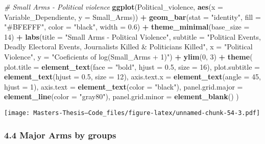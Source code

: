 \documentclass[
  11pt,
]{article}
\newenvironment{Shaded}{\begin{snugshade}}{\end{snugshade}}
\newcommand{\AttributeTok}[1]{\textcolor[rgb]{0.13,0.29,0.53}{#1}}
\newcommand{\CommentTok}[1]{\textcolor[rgb]{0.56,0.35,0.01}{\textit{#1}}}
\newcommand{\DecValTok}[1]{\textcolor[rgb]{0.00,0.00,0.81}{#1}}
\newcommand{\FloatTok}[1]{\textcolor[rgb]{0.00,0.00,0.81}{#1}}
\newcommand{\FunctionTok}[1]{\textcolor[rgb]{0.13,0.29,0.53}{\textbf{#1}}}
\newcommand{\NormalTok}[1]{#1}
\newcommand{\SpecialCharTok}[1]{\textcolor[rgb]{0.81,0.36,0.00}{\textbf{#1}}}
\newcommand{\StringTok}[1]{\textcolor[rgb]{0.31,0.60,0.02}{#1}}
\begin{document}
\begin{Shaded}
\begin{Highlighting}[]
\CommentTok{\# Small Arms {-} Political violence}
\FunctionTok{ggplot}\NormalTok{(Political\_violence, }\FunctionTok{aes}\NormalTok{(}\AttributeTok{x =}\NormalTok{ Variable\_Dependiente, }\AttributeTok{y =}\NormalTok{ Small\_Arms)) }\SpecialCharTok{+}
  \FunctionTok{geom\_bar}\NormalTok{(}\AttributeTok{stat =} \StringTok{"identity"}\NormalTok{, }\AttributeTok{fill =} \StringTok{"\#BFEFFF"}\NormalTok{, }\AttributeTok{color =} \StringTok{"black"}\NormalTok{, }\AttributeTok{width =} \FloatTok{0.6}\NormalTok{) }\SpecialCharTok{+}
  \FunctionTok{theme\_minimal}\NormalTok{(}\AttributeTok{base\_size =} \DecValTok{14}\NormalTok{) }\SpecialCharTok{+}
  \FunctionTok{labs}\NormalTok{(}\AttributeTok{title =} \StringTok{"Small Arms {-} Political Violence"}\NormalTok{,}
       \AttributeTok{subtitle =} \StringTok{"Political Events, Deadly Electoral Events, Journalists Killed \& Politicians Killed"}\NormalTok{,}
       \AttributeTok{x =} \StringTok{"Political Violence"}\NormalTok{,}
       \AttributeTok{y =} \StringTok{"Coeficients of log(Small\_Arms + 1)"}\NormalTok{) }\SpecialCharTok{+}
  \FunctionTok{ylim}\NormalTok{(}\DecValTok{0}\NormalTok{, }\DecValTok{3}\NormalTok{) }\SpecialCharTok{+}
  \FunctionTok{theme}\NormalTok{(}
    \AttributeTok{plot.title =} \FunctionTok{element\_text}\NormalTok{(}\AttributeTok{face =} \StringTok{"bold"}\NormalTok{, }\AttributeTok{hjust =} \FloatTok{0.5}\NormalTok{, }\AttributeTok{size =} \DecValTok{16}\NormalTok{),}
    \AttributeTok{plot.subtitle =} \FunctionTok{element\_text}\NormalTok{(}\AttributeTok{hjust =} \FloatTok{0.5}\NormalTok{, }\AttributeTok{size =} \DecValTok{12}\NormalTok{),}
    \AttributeTok{axis.text.x =} \FunctionTok{element\_text}\NormalTok{(}\AttributeTok{angle =} \DecValTok{45}\NormalTok{, }\AttributeTok{hjust =} \DecValTok{1}\NormalTok{),}
    \AttributeTok{axis.text =} \FunctionTok{element\_text}\NormalTok{(}\AttributeTok{color =} \StringTok{"black"}\NormalTok{),}
    \AttributeTok{panel.grid.major =} \FunctionTok{element\_line}\NormalTok{(}\AttributeTok{color =} \StringTok{"gray80"}\NormalTok{),}
    \AttributeTok{panel.grid.minor =} \FunctionTok{element\_blank}\NormalTok{()}
\NormalTok{  )}
\end{Highlighting}
\end{Shaded}

\texttt{[image: Masters-Thesis--Code\_files/figure-latex/unnamed-chunk-54-3.pdf]}

\subsubsection{4.4 Major Arms by groups}\label{major-arms-by-groups}
\end{document}
